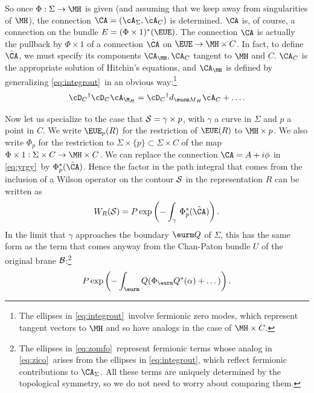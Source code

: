 So once $\Phi:\Sigma\to \MH$ is given (and assuming that we keep
away from singularities of $\MH$), the connection
$\CA=(\cA_\Sigma,\cA_C)$ is determined.  $\CA$ is, of course, a
connection on the bundle $E=(\Phi\times 1)^*({\EUE})$.
 The connection $\CA$ is actually the pullback by $\Phi\times 1$ of a
connection $\hat\CA$ on  ${\EUE}\to \MH\times C$. In fact, to
define $\hat\CA$, we must specify its components $\CA_{\MH},\CA_C$
tangent to $\MH$ and $C$.  $\CA_C$ is the appropriate solution of
Hitchin's equations, and $\CA_{\MH}$ is defined by generalizing
\eqref{eq:integrout}\ in an obvious way:\footnote{The ellipses in \eqref{eq:integrout}\
involve fermionic zero modes, which represent tangent vectors to
$\MH$ and so have analogs in the case of $\MH\times C$.}
\setcounter{equation}{3}
\begin{equation}\label{eq:pintegrout}
\cD_C{}^\dagger \cD_C \cA_{\M_H}=\cD_C{}^\dagger
d_{{\eusm M}_H} \cA_C+\dots.
\end{equation}

Now let us specialize to the case that ${{\cal S}}=\gamma\times
p$, with $\gamma$ a curve in $\Sigma$ and $p$ a point in $C$.  We
write ${\EUE}_p(R)$ for the restriction of ${\EUE}(R)$ to
$\MH\times p$. We also write $\Phi_p$ for the restriction to
$\Sigma\times \{p\}\subset \Sigma\times C$ of the map $\Phi\times
1:\Sigma\times C\to \MH\times C$. We can replace the connection
$\CA=A+i\phi$ in \eqref{eq:yrgy}\ by $\Phi_p^*(\hat\CA)$.  Hence the factor
in the path integral that comes from the inclusion of a Wilson
operator on the contour ${{\cal S}}$ in the representation $R$ can
be written as %
\setcounter{equation}{4}
\begin{equation}\label{eq:zico}
W_R({{\cal S}})=
P\exp\left(-\int_\gamma\,\Phi_p^*(\hat\CA)\right).
\end{equation}
 In the limit that
$\gamma$ approaches the boundary $\QQ$ of $\Sigma$, this has the
same form as the term that comes anyway from the Chan-Paton bundle
$U$ of the original brane ${\cal B}$:\footnote{The ellipses in \eqref{eq:zomfo}\
represent fermionic terms whose analog in \eqref{eq:zico}\ arises from the
ellipses in \eqref{eq:integrout}, which reflect fermionic contributions to
$\CA_\Sigma$. All these terms are uniquely determined by the
topological symmetry, so we do not need to worry about comparing
them.} %
\setcounter{equation}{5}
\begin{equation}\label{eq:zomfo}
P\exp\left(-\int_\QQ (\Phi_\QQ^*(\alpha)
+\dots)\right).
\end{equation}


